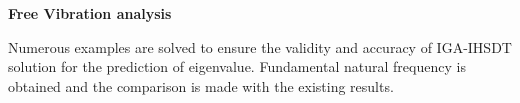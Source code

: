 \documentclass[3p,preprint,12pt]{elsarticle}
\begin{document}
\begin{flushleft}
	\textbf{Free Vibration analysis}
\end{flushleft}
Numerous examples are solved to ensure the validity and accuracy of IGA-IHSDT solution for the prediction of eigenvalue. Fundamental natural frequency is obtained and the comparison is made with the existing results.%

%
\end{document}
